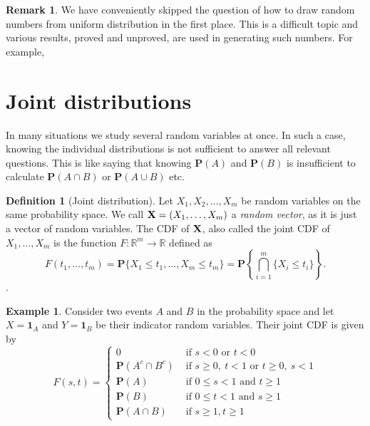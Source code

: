 \documentclass[preprint,  11pt]{amsart}
\theoremstyle{plain} %
\theoremstyle{definition} %
\newtheorem{definition}[theorem]{Definition}
\newtheorem{remark}[theorem]{Remark}
\newtheorem{example}[theorem]{Example}
\begin{document}
\begin{remark} We have conveniently skipped the question of how to draw random numbers from uniform distribution in the first place. This is a difficult topic and various results, proved and unproved, are used in generating such numbers. For example, 
\end{remark}

\section{Joint distributions}
In many situations we study several random variables at once. In such a case, knowing the individual distributions is not sufficient to answer all relevant questions. This is like saying that knowing $\mathbf{P}(A)$ and $\mathbf{P}(B)$ is insufficient to calculate $\mathbf{P}(A\cap B)$ or $\mathbf{P}(A\cup B)$ etc.

\begin{definition}[Joint distribution] Let $X_{1},X_{2},\ldots ,X_{m}$ be random variables on the same probability space. We call ${\bf X}=(X_{1},\ldots ,X_{m})$ a {\em random vector}, as it is just a vector of random variables. The CDF of ${\bf X}$, also called the joint CDF of $X_{1},\ldots,X_{m}$ is the function $F:\mathbb{R}^{m}\rightarrow \mathbb{R}$ defined as
$$
F(t_{1},\ldots ,t_{m})=\mathbf{P}\{X_{1}\le t_{1},\ldots ,X_{m}\le t_{m}\} = \mathbf{P}\left\{\bigcap_{i=1}^{m}\{X_{i}\le t_{i}\} \right\}.
$$. 
\end{definition}
\begin{example} Consider two events $A$ and $B$ in the probability space and let $X={\mathbf 1}_{A}$ and $Y={\mathbf 1}_{B}$ be their indicator random variables. Their joint CDF is given by
$$
F(s,t)=\begin{cases}
0 & \mbox{ if }s< 0 \mbox{ or }t< 0 \\
\mathbf{P}(A^{c}\cap B^{c}) & \mbox{ if }s\ge 0, \ t<1\mbox{ or }t\ge 0, \ s<1 \\
\mathbf{P}(A) & \mbox{ if }0\le s<1\mbox{ and }t\ge 1 \\
\mathbf{P}(B) & \mbox{ if }0\le t<1\mbox{ and }s\ge 1 \\
\mathbf{P}(A\cap B) & \mbox{ if } s\ge1, t\ge 1
\end{cases}
$$
\end{example}
\end{document}
